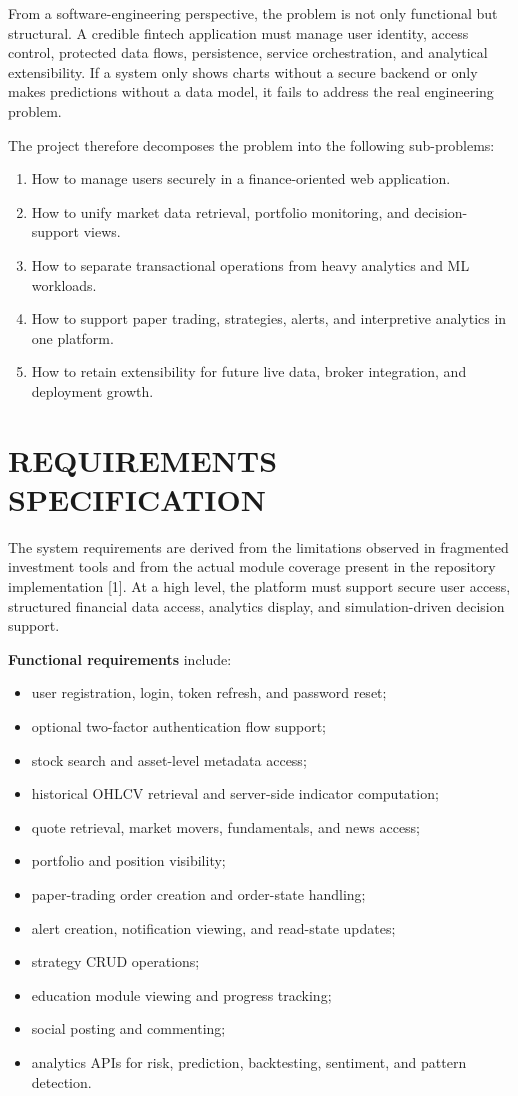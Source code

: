 \documentclass[12pt,a4paper]{report}
\begin{document}
From a software-engineering perspective, the problem is not only functional but structural. A credible fintech application must manage user identity, access control, protected data flows, persistence, service orchestration, and analy­tical extensibility. If a system only shows charts without a secure backend or only makes predictions without a data model, it fails to address the real engineering problem.

The project therefore decomposes the problem into the following sub-problems:
\begin{enumerate}[label=\arabic*.]
\item How to manage users securely in a finance-oriented web application.
\item How to unify market data retrieval, portfolio monitoring, and decision-support views.
\item How to separate transactional operations from heavy analytics and ML workloads.
\item How to support paper trading, strategies, alerts, and interpretive analytics in one platform.
\item How to retain extensibility for future live data, broker integration, and deployment growth.
\end{enumerate}

\section{REQUIREMENTS SPECIFICATION}
The system requirements are derived from the limitations observed in fragmented investment tools and from the actual module coverage present in the repository implementation [1]. At a high level, the platform must support secure user access, structured financial data access, analytics display, and simulation-driven decision support.

\textbf{Functional requirements} include:
\begin{itemize}
\item user registration, login, token refresh, and password reset;
\item optional two-factor authentication flow support;
\item stock search and asset-level metadata access;
\item historical OHLCV retrieval and server-side indicator computation;
\item quote retrieval, market movers, fundamentals, and news access;
\item portfolio and position visibility;
\item paper-trading order creation and order-state handling;
\item alert creation, notification viewing, and read-state updates;
\item strategy CRUD operations;
\item education module viewing and progress tracking;
\item social posting and commenting;
\item analytics APIs for risk, prediction, backtesting, sentiment, and pattern detection.
\end{itemize}
\end{document}

